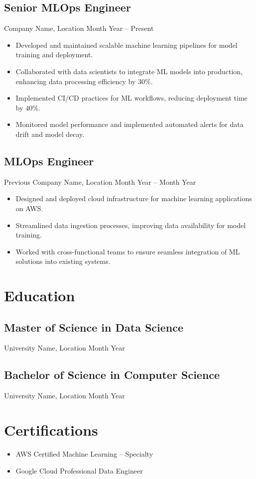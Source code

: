 \documentclass[a4paper,10pt]{article}
\begin{document}
\subsection*{Senior MLOps Engineer}
Company Name, Location \hfill Month Year -- Present
\begin{itemize}[leftmargin=*]
    \item Developed and maintained scalable machine learning pipelines for model training and deployment.
    \item Collaborated with data scientists to integrate ML models into production, enhancing data processing efficiency by 30\%.
    \item Implemented CI/CD practices for ML workflows, reducing deployment time by 40\%.
    \item Monitored model performance and implemented automated alerts for data drift and model decay.
\end{itemize}

\subsection*{MLOps Engineer}
Previous Company Name, Location \hfill Month Year -- Month Year
\begin{itemize}[leftmargin=*]
    \item Designed and deployed cloud infrastructure for machine learning applications on AWS.
    \item Streamlined data ingestion processes, improving data availability for model training.
    \item Worked with cross-functional teams to ensure seamless integration of ML solutions into existing systems.
\end{itemize}

\section*{Education}
\subsection*{Master of Science in Data Science}
University Name, Location \hfill Month Year

\subsection*{Bachelor of Science in Computer Science}
University Name, Location \hfill Month Year

\section*{Certifications}
\begin{itemize}[leftmargin=*]
    \item AWS Certified Machine Learning – Specialty
    \item Google Cloud Professional Data Engineer
\end{itemize}
\end{document}
